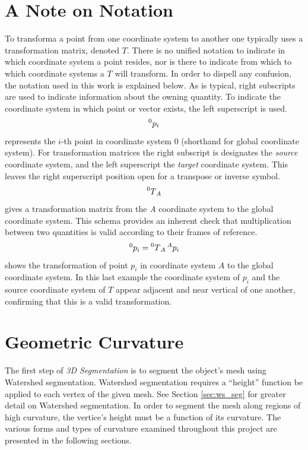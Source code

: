 \section{A Note on Notation}
To transforma a point from one coordinate system to another one typically uses a transformation matrix, denoted $T$.
There is no unified notation to indicate in which coordinate system a point resides, nor is there to indicate from which to which coordinate systems a $T$ will transform.
In order to dispell any confusion, the notation used in this work is explained below.
As is typical, right subscripts are used to indicate information about the owning quantity.
To indicate the coordinate system in which point or vector exists, the left superscript is used.
\begin{equation*}
	\prescript{0}{}p_i
\end{equation*}
represents the $i$-th point in coordinate system 0 (shorthand for global coordinate system).
For transformation matrices the right subscript is designates the \textit{source} coordinate system, and the left superscript the \textit{target} coordinate system.
This leaves the right superscript position open for a transpose or inverse symbol.
\begin{equation*}
	\prescript{0}{}T_{A}
\end{equation*}
gives a transformation matrix from the \textit{A} coordinate system to the global coordinate system.
This schema provides an inherent check that multiplication between two quantities is valid according to their frames of reference.
\begin{equation*}
	\prescript{0}{}p_i = \prescript{0}{}T_{A} \prescript{A}{}p_i
\end{equation*}
shows the transformation of point $p_i$ in coordinate system $A$ to the global coordinate system.
In this last example the coordinate system of $p_i$ and the source coordinate system of $T$ appear adjacent and near vertical of one another, confirming that this is a valid transformation.

\section{Geometric Curvature}
The first step of \textit{3D Segmentation} is to segment the object's mesh using Watershed segmentation.
Watershed segmentation requires a ``height'' function be applied to each vertex of the given mesh.
See Section \ref{sec:ws_seg} for greater detail on Watershed segmentation.
In order to segment the mesh along regions of high curvature, the vertice's height must be a function of its curvature.
The various forms and types of curvature examined throughout this project are presented in the following sections.

